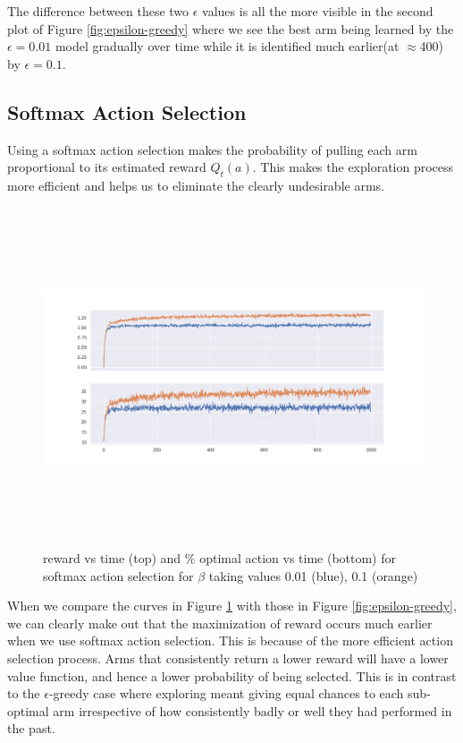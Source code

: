 \documentclass[12pt]{extarticle}
\begin{document}
The difference between these two $\epsilon$ values is all the more visible in the second plot of Figure \ref{fig:epsilon-greedy} where we see the best arm being learned by the $\epsilon=0.01$ model gradually over time while it is identified much earlier(at $\approx$400) by $\epsilon=0.1$.

\subsection{Softmax Action Selection}

Using a softmax action selection makes the probability of pulling each arm proportional to its estimated reward $Q_t(a)$. This makes the exploration process more efficient and helps us to eliminate the clearly undesirable arms.\\

\begin{figure}[H]
	\includegraphics[width=\textwidth, height=10cm]{softmax-action-selection.png}
	\caption{reward vs time (top) and $\%$ optimal action vs time (bottom) for softmax action selection for $\beta$ taking values 0.01 (blue), 0.1 (orange)}
	\label{fig:softmax-action-selection}
\end{figure}

When we compare the curves in Figure \ref{fig:softmax-action-selection} with those in Figure \ref{fig:epsilon-greedy}, we can clearly make out that the maximization of reward occurs much earlier when we use softmax action selection. This is because of the more efficient action selection process. Arms that consistently return a lower reward will have a lower value function, and hence a lower probability of being selected. This is in contrast to the $\epsilon$-greedy case where exploring meant giving equal chances to each sub-optimal arm irrespective of how consistently badly or well they had performed in the past.\\
\end{document}
